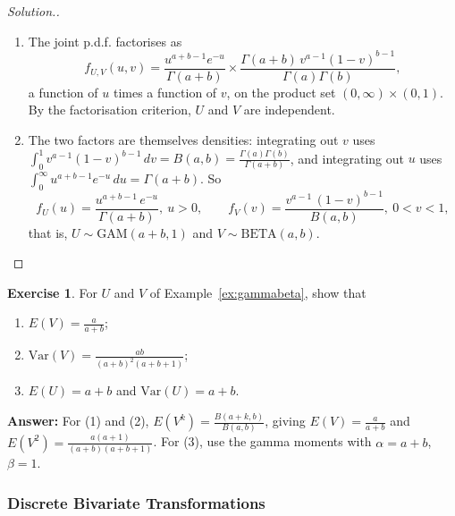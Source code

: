 \documentclass[12pt,a4paper]{report}
\theoremstyle{definition}
\newtheorem{exe}[thm]{Exercise}
\theoremstyle{plain}
\newenvironment{solution}
  {\renewcommand{\qedsymbol}{}\begin{proof}[\textit{Solution}.]}
  {\end{proof}}
\begin{document}
\begin{solution}
\begin{enumerate}
The Jacobian is
\[ J = \begin{vmatrix} v & u \\ 1-v & -u \end{vmatrix} = -uv - u(1-v) = -u
,\qquad |J| = u ,\]
so by Theorem~\ref{thm:transbivariate}
\begin{align*}
f_{U,V}(u,v) &= \frac{(uv)^{a-1} (u(1-v))^{b-1} e^{-u}}{\Gamma(a)\Gamma(b)}\cdot u\\
&= \frac{u^{a+b-1} e^{-u}\, v^{a-1} (1-v)^{b-1}}{\Gamma(a)\Gamma(b)} ,\qquad u>0,\ 0<v<1 .
\end{align*}

\item[(ii)] The joint p.d.f. factorises as
\[f_{U,V}(u,v) = \frac{u^{a + b - 1} e^{-u}}{\Gamma(a + b)} \times \frac{\Gamma(a +
b)\, v^{a - 1}(1 - v)^{b - 1}}{\Gamma(a)\Gamma(b)} ,\]
a function of $u$ times a function of $v$, on the product set
$(0,\infty)\times(0,1)$. By the factorisation criterion, $U$ and $V$ are
independent.

\item[(iii)] The two factors are themselves densities: integrating out $v$ uses
$\int_0^1v^{a-1}(1 - v)^{b-1}\,dv = B(a,b) = \frac{\Gamma(a)\Gamma(b)}{\Gamma(a +
b)}$, and integrating out $u$ uses $\int_0^\infty u^{a+b-1}e^{-u}\,du = \Gamma(a +
b)$. So
\[f_U(u) = \frac{u^{a + b - 1} \, e^{-u}}{\Gamma(a + b)},\ u > 0,\qquad f_V(v) =
\frac{v^{a - 1}\, (1 - v)^{b - 1}}{B(a,b)},\ 0 < v < 1 ,\]
that is, $U\sim\text{GAM}(a + b ,1)$ and $V \sim\text{BETA}(a,b)$.
\end{enumerate}
\end{solution}

\begin{exe}
\label{exe:gammabetamoments}
For $U$ and $V$ of Example~\ref{ex:gammabeta}, show that
\begin{enumerate}
\item $E(V) = \frac{a}{a+b}$;
\item $\text{Var}(V) = \frac{ab}{(a+b)^2(a+b+1)}$;
\item $E(U) = a+b$ and $\text{Var}(U) = a+b$.
\end{enumerate}

\textbf{Answer:} For (1) and (2), $E(V^k) = \frac{B(a + k,b)}{B(a,b)}$, giving
$E(V) = \frac{a}{a + b}$ and $E(V^2) = \frac{a(a + 1)}{(a + b)(a + b + 1)}$. For
(3), use the gamma moments with $\alpha = a + b$, $\beta = 1$.
\end{exe}

\subsubsection{Discrete Bivariate Transformations}
\end{document}
